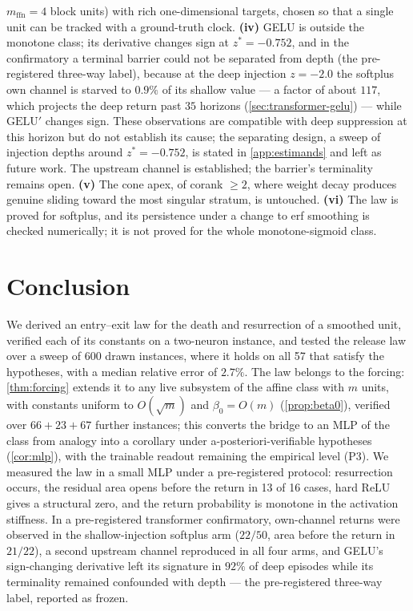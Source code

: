 \documentclass[11pt]{article}
\theoremstyle{definition}
\theoremstyle{remark}
\begin{document}
$m_{\mathrm{ffn}}=4$ block units) with rich one-dimensional targets, chosen so
that a single unit can be tracked with a ground-truth clock.
\textbf{(iv)} GELU is outside the monotone class; its derivative changes sign at
$z^\ast=-0.752$, and in the confirmatory a terminal barrier could not be
separated from depth (the pre-registered three-way label), because at the deep
injection $z=-2.0$ the softplus own channel is starved to $0.9\%$ of its shallow
value --- a factor of about $117$, which projects the deep return past $35$
horizons (\cref{sec:transformer-gelu}) --- while $\mathrm{GELU}'$ changes sign. These observations are compatible
with deep suppression at this horizon but do not establish its cause; the separating design,
a sweep of injection depths around
$z^\ast=-0.752$, is stated in \cref{app:estimands} and left as future work. The
upstream channel is established; the barrier's terminality remains open.
\textbf{(v)} The cone apex, of corank $\ge2$, where weight decay produces genuine
sliding toward the most singular stratum, is untouched.
\textbf{(vi)} The law is proved for softplus, and its persistence under a change
to erf smoothing is checked numerically; it is not proved for the whole
monotone-sigmoid class.

\section{Conclusion}\label{sec:conclusion}

We derived an entry--exit law for the death and resurrection of a smoothed unit,
verified each of its constants on a two-neuron instance, and tested the release
law over a sweep of 600 drawn instances, where it holds on all 57 that satisfy
the hypotheses, with a median relative error of $2.7\%$. The law belongs to the
forcing: \cref{thm:forcing} extends it to any live subsystem of the affine
class with $m$ units, with constants uniform to $O(\sqrt m)$ and
$\beta_0=O(m)$ (\cref{prop:beta0}), verified over $66+23+67$ further
instances; this converts the bridge to an MLP of the class from analogy into
a corollary under a-posteriori-verifiable hypotheses (\cref{cor:mlp}), with
the trainable readout remaining the empirical level (P3). We measured the law
in a small MLP under a pre-registered protocol: resurrection occurs, the residual
area opens before the return in 13 of 16 cases, hard ReLU gives a structural
zero, and the return probability is monotone in the activation stiffness. In a
pre-registered transformer confirmatory, own-channel returns were observed
in the shallow-injection softplus arm ($22/50$, area before the return
in $21/22$), a second upstream channel reproduced in all four arms, and GELU's
sign-changing derivative left its signature in $92\%$ of deep episodes while its
terminality remained confounded with depth --- the pre-registered three-way
label, reported as frozen.
\end{document}

